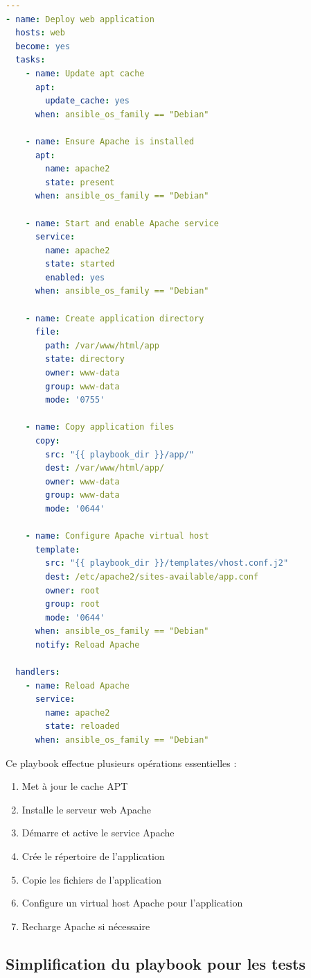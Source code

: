 \documentclass{article}
\begin{document}
\begin{lstlisting}[language=yaml]
---
- name: Deploy web application
  hosts: web
  become: yes
  tasks:
    - name: Update apt cache
      apt:
        update_cache: yes
      when: ansible_os_family == "Debian"

    - name: Ensure Apache is installed
      apt:
        name: apache2
        state: present
      when: ansible_os_family == "Debian"

    - name: Start and enable Apache service
      service:
        name: apache2
        state: started
        enabled: yes
      when: ansible_os_family == "Debian"

    - name: Create application directory
      file:
        path: /var/www/html/app
        state: directory
        owner: www-data
        group: www-data
        mode: '0755'

    - name: Copy application files
      copy:
        src: "{{ playbook_dir }}/app/"
        dest: /var/www/html/app/
        owner: www-data
        group: www-data
        mode: '0644'

    - name: Configure Apache virtual host
      template:
        src: "{{ playbook_dir }}/templates/vhost.conf.j2"
        dest: /etc/apache2/sites-available/app.conf
        owner: root
        group: root
        mode: '0644'
      when: ansible_os_family == "Debian"
      notify: Reload Apache

  handlers:
    - name: Reload Apache
      service:
        name: apache2
        state: reloaded
      when: ansible_os_family == "Debian"
\end{lstlisting}

Ce playbook effectue plusieurs opérations essentielles :
\begin{enumerate}
    \item Met à jour le cache APT
    \item Installe le serveur web Apache
    \item Démarre et active le service Apache
    \item Crée le répertoire de l'application
    \item Copie les fichiers de l'application
    \item Configure un virtual host Apache pour l'application
    \item Recharge Apache si nécessaire
\end{enumerate}

\subsection{Simplification du playbook pour les tests}
\end{document}
